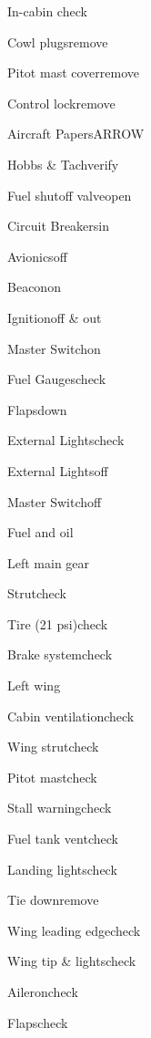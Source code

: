  




\begin{multicols}{2}
\begin{checklist}{In-cabin check}
  \item{Cowl plugs}{remove}
  \item{Pitot mast cover}{remove}
  \item{Control lock}{remove}
  \item{Aircraft Papers}{ARROW}
  \item{Hobbs \& Tach}{verify}
  \item{Fuel shutoff valve}{open}
  \item{Circuit Breakers}{in}
  \item{Avionics}{off}
  \item{Beacon}{on}
  \item{Ignition}{off \& out}
  \item{Master Switch}{on}
  \item{Fuel Gauges}{check}
  \item{Flaps}{down}
  \item{External Lights}{check}
  \item{External Lights}{off}
  \item{Master Switch}{off}
\end{checklist}

\begin{checklist}{Fuel and oil}
\end{checklist}

\begin{checklist}{Left main gear}
  \item{Strut}{check}
  \item{Tire (21 psi)}{check}
  \item{Brake system}{check}
\end{checklist}

\begin{checklist}{Left wing}
  \item{Cabin ventilation}{check}
  \item{Wing strut}{check}
  \item{Pitot mast}{check}
  \item{Stall warning}{check}
  \item{Fuel tank vent}{check}
  \item{Landing lights}{check}
  \item{Tie down}{remove}
  \item{Wing leading edge}{check}
  \item{Wing tip \& lights}{check}
  \item{Aileron}{check}
  \item{Flaps}{check}
\end{checklist}


\end{multicols}
